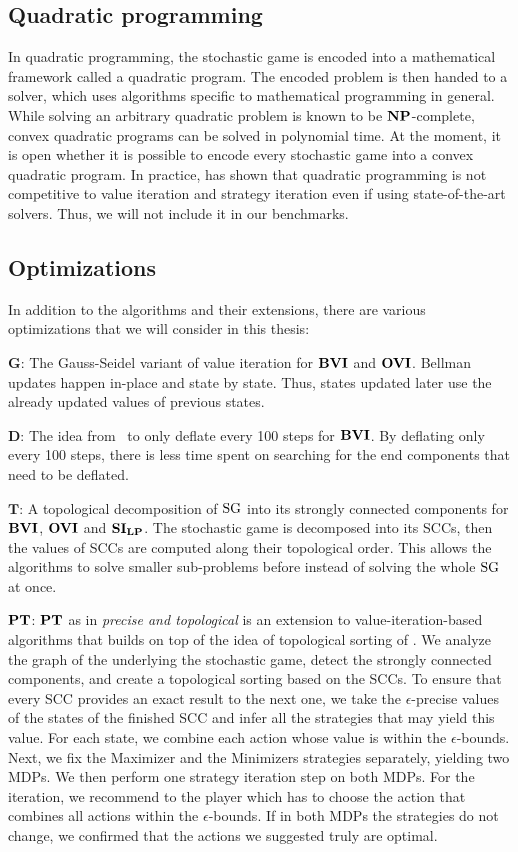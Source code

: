 \subsection{Quadratic programming}
In quadratic programming, the stochastic game is encoded into a mathematical framework called a quadratic program. 
The encoded problem is then handed to a solver, which uses algorithms specific to mathematical programming in general.
While solving an arbitrary quadratic problem is known to be $\mathbf{NP}$-complete, convex quadratic programs can be solved in polynomial time.
At the moment, it is open whether it is possible to encode every stochastic game into a convex quadratic program.
In practice, \cite{gandalf} has shown that quadratic programming is not competitive to value iteration and strategy iteration even if using 
state-of-the-art solvers. Thus, we will not include it in our benchmarks.

\subsection{Optimizations} \label{subsec:optimizations}
In addition to the algorithms and their extensions, there are various optimizations that we will consider in this thesis:

$\mathbf{G}$: The Gauss-Seidel variant of value iteration for $\mathbf{BVI}$ and $\mathbf{OVI}$. 
Bellman updates happen in-place and state by state. Thus, states updated later use the already updated values of previous states. 

$\mathbf{D}$: The idea from~\cite{paperMaxi} to only deflate every 100 steps for $\mathbf{BVI}$. 
By deflating only every 100 steps, there is less time spent on searching for the end components that need to be deflated.

$\mathbf{T}$: A topological decomposition of $\textrm{SG}$ into its strongly connected components for $\mathbf{BVI}$, $\mathbf{OVI}$ and $\mathbf{SI_{LP}}$.
The stochastic game is decomposed into its SCCs, then the values of SCCs are computed along their topological order.
This allows the algorithms to solve smaller sub-problems before instead of solving the whole $\textrm{SG}$ at once.

$\mathbf{PT}$: $\mathbf{PT}$ as in \emph{precise and topological} is an extension to value-iteration-based algorithms that builds on top of the idea of topological sorting of \cite{gandalf}.
We analyze the graph of the underlying the stochastic game, detect the strongly connected components, and create a topological sorting based on the SCCs.
To ensure that every SCC provides an exact result to the next one, we take the $\epsilon$-precise values of the states of the finished SCC and infer all the
strategies that may yield this value.
For each state, we combine each action whose value is within the $\epsilon$-bounds.
Next, we fix the Maximizer and the Minimizers strategies separately, yielding two MDPs. We then perform one strategy iteration step on both MDPs.
For the iteration, we recommend to the player which has to choose the action that combines all actions within the $\epsilon$-bounds.
If in both MDPs the strategies do not change, we confirmed that the actions we suggested truly are optimal.


